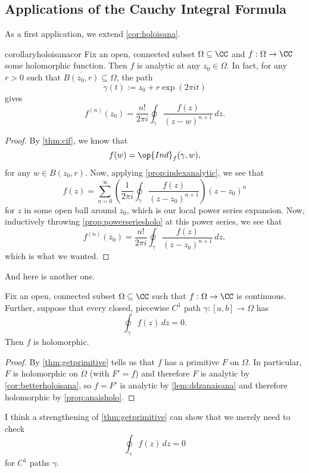 \subsection{Applications of the Cauchy Integral Formula}
As a first application, we extend \autoref{cor:holoisana}.
\begin{restatable}{corollary}{holoisanacor} \label{cor:betterholoisana}
	Fix an open, connected subset $\Omega\subseteq\CC$ and $f:\Omega\to\CC$ some holomorphic function. Then $f$ is analytic at any $z_0\in\Omega$. In fact, for any $r>0$ such that $\overline{B(z_0,r)}\subseteq\Omega$, the path
	\[\gamma(t):=z_0+r\exp(2\pi it)\]
	gives
	\[f^{(n)}(z_0)=\frac{n!}{2\pi i}\oint_\gamma\frac{f(z)}{(z-w)^{n+1}}\,dz.\]
\end{restatable}
\begin{proof}
	By \autoref{thm:cif}, we know that
	\[f(w)=\op{Ind}_f(\gamma,w),\]
	for any $w\in B(z_0,r)$. Now, applying \autoref{prop:indexanalytic}, we see that 
	\[f(z)=\sum_{n=0}^\infty\left(\frac1{2\pi i}\oint_\gamma\frac{f(z)}{(z-z_0)^{n+1}}\right)(z-z_0)^n\]
	for $z$ in some open ball around $z_0$, which is our local power series expansion. Now, inductively throwing \autoref{prop:powerseriesholo} at this power series, we see that
	\[f^{(n)}(z_0)=\frac{n!}{2\pi i}\oint_\gamma\frac{f(z)}{(z-z_0)^{n+1}}\,dz,\]
	which is what we wanted.
\end{proof}
And here is another one.
\begin{theorem}[Morera] \label{thm:morera}
	Fix an open, connected subset $\Omega\subseteq\CC$ such that $f:\Omega\to\CC$ is continuous. Further, suppose that every closed, piecewise $C^1$ path $\gamma:[a,b]\to\Omega$ has
	\[\oint_\gamma f(z)\,dz=0.\]
	Then $f$ is holomorphic.
\end{theorem}
\begin{proof}
	By \autoref{thm:getprimitive} tells us that $f$ has a primitive $F$ on $\Omega$. In particular, $F$ is holomorphic on $\Omega$ (with $F'=f$) and therefore $F$ is analytic by \autoref{cor:betterholoisana}, so $f=F'$ is analytic by \autoref{lem:ddzanaisana} and therefore holomorphic by \autoref{prop:anaisholo}.
\end{proof}
\begin{remark}
	I think a strengthening of \autoref{thm:getprimitive} can show that we merely need to check
	\[\oint_\gamma f(z)\,dz=0\]
	for $C^1$ paths $\gamma$.
\end{remark}

